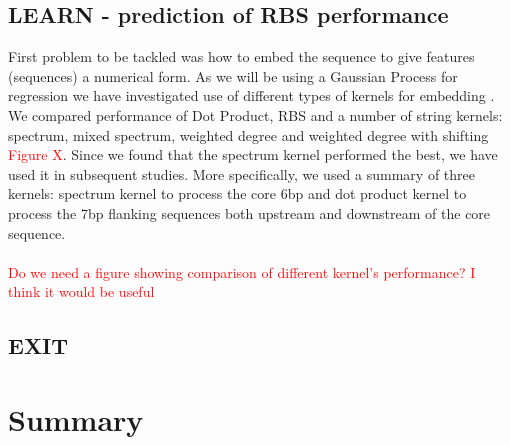 \documentclass{article}
\begin{document}
\subsection{LEARN - prediction of RBS performance}
First problem to be tackled was how to embed the sequence to give features (sequences) a numerical form. As we will be using a Gaussian Process for regression we have investigated use of different types of kernels for embedding \cite{Ben-Hur2008}. We compared performance of Dot Product, RBS and a number of string kernels: spectrum, mixed spectrum, weighted degree and weighted degree with shifting \textcolor{red}{Figure X}. Since we found that the spectrum kernel performed the best, we have used it in subsequent studies. More specifically, we used a summary of three kernels: spectrum kernel to process the core 6bp and dot product kernel to process the 7bp flanking sequences both upstream and downstream of the core sequence. 
\\
\\
\textcolor{red}{Do we need a figure showing comparison of different kernel's performance? I think it would be useful}

\subsection{EXIT}
\section{Summary}

\newpage

\printbibliography

\clearpage

\appendix

\end{document}
